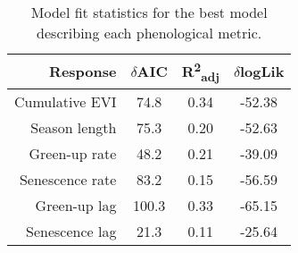 \begin{table}[H]
\centering
\begin{tabular}{rccc}
  \hline
Response & $\delta$AIC & R\textsuperscript{2}\textsubscript{adj} & $\delta$logLik \\ 
  \hline
Cumulative EVI & 74.8 & 0.34 & -52.38 \\ 
  Season length & 75.3 & 0.20 & -52.63 \\ 
  Green-up rate & 48.2 & 0.21 & -39.09 \\ 
  Senescence rate & 83.2 & 0.15 & -56.59 \\ 
  Green-up lag & 100.3 & 0.33 & -65.15 \\ 
  Senescence lag & 21.3 & 0.11 & -25.64 \\ 
   \hline
\end{tabular}
\caption{Model fit statistics for the best model describing each phenological metric.} 
\label{phen:mod_stat}
\end{table}

